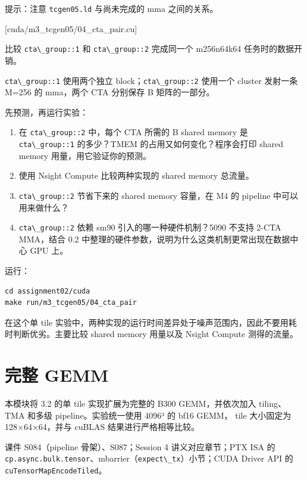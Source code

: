 \documentclass[11pt,a4paper,fontset=none]{ctexart}
\providecommand{\passthrough}[1]{#1}
\begin{document}
提示：注意 \passthrough{\lstinline!tcgen05.ld!} 与尚未完成的 mma
之间的关系。

[cuda/m3\_tcgen05/04\_cta\_pair.cu]

比较 \passthrough{\lstinline!cta\_group::1!} 和
\passthrough{\lstinline!cta\_group::2!} 完成同一个 m256n64k64
任务时的数据开销。

\passthrough{\lstinline!cta\_group::1!} 使用两个独立
block；\passthrough{\lstinline!cta\_group::2!} 使用一个 cluster 发射一条
M=256 的 mma，两个 CTA 分别保存 B 矩阵的一部分。

先预测，再运行实验：

\begin{enumerate}
\def\labelenumi{(\alph{enumi})}
\item
  在 \passthrough{\lstinline!cta\_group::2!} 中，每个 CTA 所需的 B
  shared memory 是 \passthrough{\lstinline!cta\_group::1!} 的多少？TMEM
  的占用又如何变化？程序会打印 shared memory 用量，用它验证你的预测。
\item
  使用 Nsight Compute 比较两种实现的 shared memory 总流量。
\item
  \passthrough{\lstinline!cta\_group::2!} 节省下来的 shared memory
  容量，在 M4 的 pipeline 中可以用来做什么？
\item
  \passthrough{\lstinline!cta\_group::2!} 依赖 sm90
  引入的哪一种硬件机制？5090 不支持 2-CTA MMA，结合 0.2
  中整理的硬件参数，说明为什么这类机制更常出现在数据中心 GPU 上。
\end{enumerate}

运行：

\begin{lstlisting}
cd assignment02/cuda
make run/m3_tcgen05/04_cta_pair
\end{lstlisting}

在这个单 tile
实验中，两种实现的运行时间差异处于噪声范围内，因此不要用耗时判断优劣。主要比较
shared memory 用量以及 Nsight Compute 测得的流量。

\section{完整 GEMM}\label{ux5b8cux6574-gemm}

本模块将 3.2 的单 tile 实现扩展为完整的 B300 GEMM，并依次加入
tiling、TMA 和多级 pipeline。实验统一使用 4096³ 的 bf16 GEMM， tile
大小固定为 128×64×64，并与 cuBLAS 结果进行严格相等比较。

\begin{reading}

课件 S084（pipeline 骨架）、S087；Session 4 讲义对应章节；PTX ISA 的
\passthrough{\lstinline!cp.async.bulk.tensor!}、mbarrier（\passthrough{\lstinline!expect\_tx!}）小节；CUDA
Driver API 的 \passthrough{\lstinline!cuTensorMapEncodeTiled!}。

\end{reading}
\end{document}
